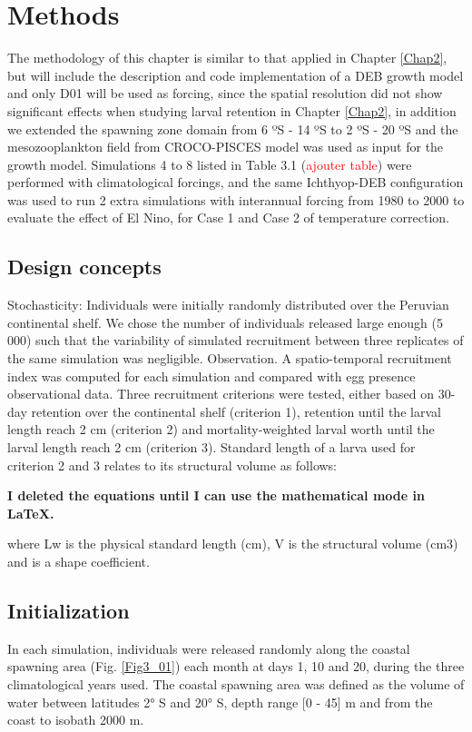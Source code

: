 \section{Methods}\label{Chap3Meth}
The methodology of this chapter is similar to that applied in Chapter \ref{Chap2}, but will include the description and code implementation of a DEB growth model and only D01 will be used as forcing, since the spatial resolution did not show significant effects when studying larval
retention in Chapter \ref{Chap2}, in addition we extended the spawning zone domain from 6 ºS -
14 ºS to 2 ºS - 20 ºS and the mesozooplankton field from CROCO-PISCES model was used as input for the growth model. Simulations 4 to 8 listed in Table 3.1 (\textcolor{red}{ajouter table}) were performed with climatological forcings, and the same Ichthyop-DEB configuration was used to run 2 extra simulations with interannual forcing from 1980 to 2000 to evaluate the effect of El Nino, for Case 1 and Case 2 of temperature correction.

\subsection{Design concepts}
Stochasticity: Individuals were initially randomly distributed over the Peruvian continental
shelf. We chose the number of individuals released large enough (5 000) such that
the variability of simulated recruitment between three replicates of the same simulation
was negligible. Observation. A spatio-temporal recruitment index was computed for each
simulation and compared with egg presence observational data. Three recruitment criterions
were tested, either based on 30-day retention over the continental shelf (criterion
1), retention until the larval length reach 2 cm (criterion 2) and mortality-weighted larval
worth until the larval length reach 2 cm (criterion 3). Standard length of a larva used for
criterion 2 and 3 relates to its structural volume as follows:

\textbf{I deleted the equations until I can use the mathematical mode in LaTeX.}

where Lw is the physical standard length (cm), V is the structural volume (cm3) and
is a shape coefficient.

\subsection{Initialization}
In each simulation, individuals were released randomly along the coastal spawning area
(Fig. \ref{Fig3_01}) each month at days 1, 10 and 20, during the three climatological years used.
The coastal spawning area was defined as the volume of water between latitudes 2° S
and 20° S, depth range [0 - 45] m and from the coast to isobath 2000 m.

